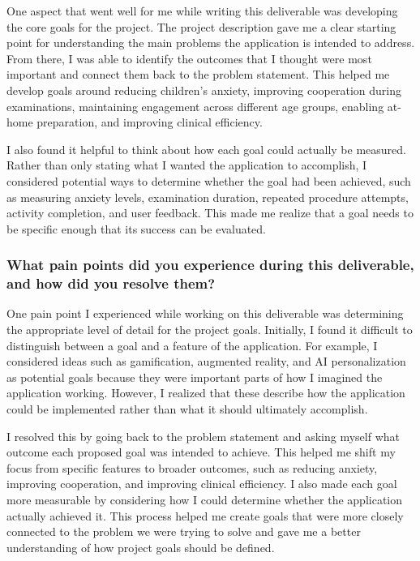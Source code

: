 \documentclass{article}
\begin{document}
One aspect that went well for me while writing this deliverable was developing the core goals for the project. The project description gave me a clear starting point for 
understanding the main problems the application is intended to address. From there, I was able to identify the outcomes that I thought were most important and connect them 
back to the problem statement. This helped me develop goals around reducing children's anxiety, improving cooperation during examinations, maintaining engagement across 
different age groups, enabling at-home preparation, and improving clinical efficiency.

I also found it helpful to think about how each goal could actually be measured. Rather than only stating what I wanted the application to accomplish, I considered potential 
ways to determine whether the goal had been achieved, such as measuring anxiety levels, examination duration, repeated procedure attempts, activity completion, and user 
feedback. This made me realize that a goal needs to be specific enough that its success can be evaluated.

\subsubsection*{What pain points did you experience during this deliverable, and how did you resolve them?}

One pain point I experienced while working on this deliverable was determining the appropriate level of detail for the project goals. Initially, I found it difficult to 
distinguish between a goal and a feature of the application. For example, I considered ideas such as gamification, augmented reality, and AI personalization as potential goals 
because they were important parts of how I imagined the application working. However, I realized that these describe how the application could be implemented rather than 
what it should ultimately accomplish.

I resolved this by going back to the problem statement and asking myself what outcome each proposed goal was intended to achieve. This helped me shift my focus from 
specific features to broader outcomes, such as reducing anxiety, improving cooperation, and improving clinical efficiency. I also made each goal more measurable by 
considering how I could determine whether the application actually achieved it. This process helped me create goals that were more closely connected to the problem we 
were trying to solve and gave me a better understanding of how project goals should be defined.
\end{document}
